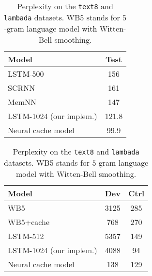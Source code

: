\documentclass{article} \usepackage{iclr2017_conference,times}
\begin{document}
\begin{table}
  \small
  \centering
  \begin{subtable}{0.44 \textwidth}
  \begin{tabular}{lc}
    \toprule
    Model & Test \\
    \midrule
    LSTM-500~\citep{mikolov2014learning}   & 156 \\
    SCRNN~\citep{mikolov2014learning}      & 161 \\
    MemNN~\citep{sukhbaatar2015end}        & 147 \\
    \midrule
    LSTM-1024 (our implem.)                & 121.8 \\
    Neural cache model                     &  99.9 \\
    \bottomrule
  \end{tabular}
  \caption{\texttt{text8}}
  \end{subtable}
  \hfill
  \begin{subtable}{0.50 \textwidth}
  \begin{tabular}{lcc}
    \toprule
    Model & Dev & Ctrl \\
    \midrule
    WB5~\citep{paperno2016lambada}       & 3125 & 285 \\
    WB5+cache~\citep{paperno2016lambada} &  768 & 270 \\
    LSTM-512~\citep{paperno2016lambada}           & 5357 & 149 \\
    \midrule
    LSTM-1024 (our implem.)                   & 4088 &  94 \\
    Neural cache model                        &  138 & 129 \\
    \bottomrule
  \end{tabular}
  \caption{\texttt{lambada}}
  \end{subtable}

  \caption{Perplexity on the \texttt{text8} and \texttt{lambada} datasets. WB5 stands for $5$-gram language model with Witten-Bell smoothing.}
  \label{tab:text8}
\end{table}
\end{document}
